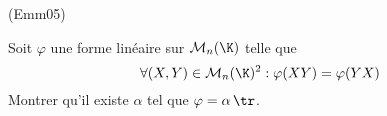 \begin{tiny}(Emm05)\end{tiny}
Soit $\varphi $ une forme lin{\'e}aire sur $\mathcal{M}_{n}(\K)$ telle que 
\begin{displaymath}
 \forall (X,Y)\in \mathcal{M}_{n}(\K)^{2} : \varphi(XY)=\varphi (YX)
\end{displaymath}
Montrer qu'il existe $\alpha $ tel que $\varphi =\alpha\,\tr$.